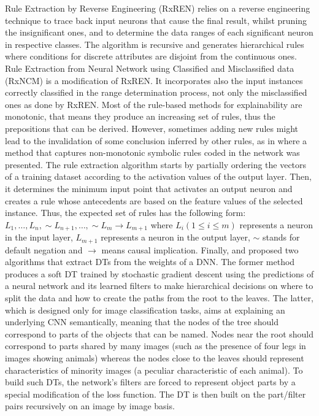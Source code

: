 \documentclass[final,1p,times]{elsarticle}
\begin{document}
Rule Extraction by Reverse Engineering (RxREN) \cite{augasta2012reverse} relies on a reverse engineering technique to trace back input neurons that cause the final result, whilst pruning the insignificant ones, and to determine the data ranges of each significant neuron in respective classes. The algorithm is recursive and generates hierarchical rules where conditions for discrete attributes are disjoint from the continuous ones. Rule Extraction from Neural Network using Classified and Misclassified data (RxNCM) \cite{biswas2017rule} is a modification of RxREN.  
It incorporates also the input instances correctly classified in the range determination process, not only the misclassified ones as done by RxREN.
Most of the rule-based methods for explainability are monotonic, that means they produce an increasing set of rules, thus the prepositions that can be derived. However, sometimes adding new rules might lead to the invalidation of some conclusion inferred by other rules, as in \cite{garcez2001symbolic} where a method that captures non-monotonic symbolic rules coded in the network was presented.
The rule extraction algorithm starts by partially ordering the vectors of a training dataset according to the activation values of the output layer. Then, it determines the minimum input point that activates an output neuron and creates a rule whose antecedents are based on the feature values of the selected instance. Thus, the expected set of rules has the following form: $L_1,\ldots,L_n, \sim L_{n+1}, \ldots, \sim L_m \to L_{m+1}$ where $L_i (1 \leq i \leq m)$ represents a neuron in the input layer, $L_{m+1}$ represents a neuron in the output layer, $\sim$ stands for default negation and $\to$ means causal implication.
Finally, \cite{frosst2017distilling} and \cite{zhang2019interpreting} proposed two algorithms that extract DTs from the weights of a DNN. The former method produces a soft DT trained by stochastic gradient descent using the predictions of a neural network and its learned filters to make hierarchical decisions on where to split the data and how to create the paths from the root to the leaves. The latter, which is designed only for image classification tasks, aims at explaining an underlying CNN semantically, meaning that the nodes of the tree should correspond to parts of the objects that can be named. Nodes near the root should correspond to parts shared by many images (such as the presence of four legs in images showing animals) whereas the nodes close to the leaves should represent characteristics of minority images (a peculiar characteristic of each animal). To build such DTs, the network's filters are forced to represent object parts by a special modification of the loss function. The DT is then built on the part/filter pairs recursively on an image by image basis.\\
\end{document}
